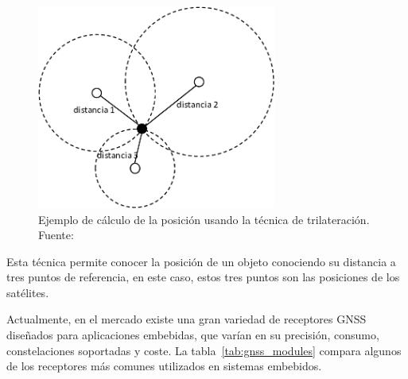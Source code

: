\begin{itemize}
    \begin{figure}[h]
        \centering
        \includegraphics[width=0.7\textwidth]{Imagenes/Bitmap/trilateracion}
        \caption{Ejemplo de cálculo de la posición usando la técnica de trilateración. Fuente: \cite{trilateracion}}
        \label{fig:trilateracion}
    \end{figure}

    Esta técnica permite conocer la posición de un objeto conociendo su distancia a tres puntos de referencia,
    en este caso, estos tres puntos son las posiciones de los satélites.

    Actualmente, en el mercado existe una gran variedad de receptores GNSS diseñados para aplicaciones embebidas, que varían en su precisión, consumo, constelaciones soportadas y coste.
    La tabla~\ref{tab:gnss_modules} compara algunos de los receptores más comunes utilizados en sistemas embebidos.
    \begin{table}[h]
        \centering
        \footnotesize
        \caption{Comparativa de receptores GNSS comunes en sistemas embebidos}
        \label{tab:gnss_modules}
    \end{table}


\end{itemize}


